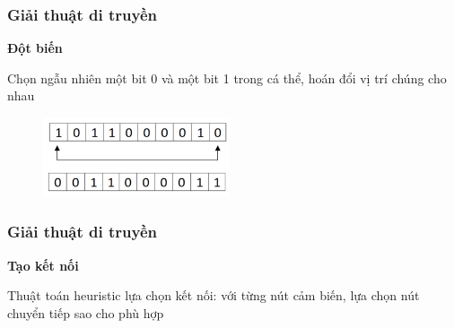 \begin{frame}
    \frametitle{Giải thuật di truyền}
    
    \textbf{Đột biến}
    
    Chọn ngẫu nhiên một bit 0 và một bit 1 trong cá thể, hoán đổi vị trí chúng cho nhau 
       
    \begin{figure}[h]
        \centering
        \includegraphics[width=5.5cm]{picture/mutation.png}
    \end{figure}
\end{frame}

\begin{frame}
    \frametitle{Giải thuật di truyền}
    
    \textbf{Tạo kết nối}
    
    Thuật toán heuristic lựa chọn kết nối: với từng nút cảm biến, lựa chọn nút chuyển tiếp sao cho phù hợp
\end{frame}

